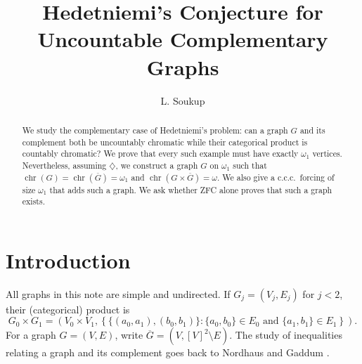 \documentclass{amsart}
\title[Uncountable Complementary Graphs]
{Hedetniemi's Conjecture for Uncountable Complementary Graphs}
\author{L. Soukup}
\numberwithin{equation}{section}
\theoremstyle{definition}
\theoremstyle{remark}
\newcommand{\chr}{\operatorname{chr}}
\begin{document}
\begin{abstract}
We study the complementary case of Hedetniemi's problem: can a graph
$G$ and its complement both be uncountably chromatic while their
categorical product is countably chromatic?  We prove that every such
example must have exactly $\omega_1$ vertices.  Nevertheless, assuming
$\diamondsuit$, we construct a graph $G$ on $\omega_1$ such that
$\chr(G)=\chr(\overline G)=\omega_1$ and
$\chr(G\times\overline G)=\omega$.  We also give a c.c.c.\ forcing of
size $\omega_1$ that adds such a graph.  We ask whether ZFC alone proves
that such a graph exists.
\end{abstract}

\maketitle

\section{Introduction}

All graphs in this note are simple and undirected.  If
$G_j=(V_j,E_j)$ for $j<2$, their (categorical) product is
\begin{displaymath}
 G_0\times G_1=
 \left(V_0\times V_1,
 \left\{\{(a_0,a_1),(b_0,b_1)\}:
       \{a_0,b_0\}\in E_0\text{ and }\{a_1,b_1\}\in E_1
 \right\}\right).
\end{displaymath}
For a graph $G=(V,E)$, write
$\overline G=(V,[V]^2\setminus E)$.  The study of inequalities relating
a graph and its complement goes back to Nordhaus and Gaddum
\cite{NordhausGaddum1956}.
\end{document}
